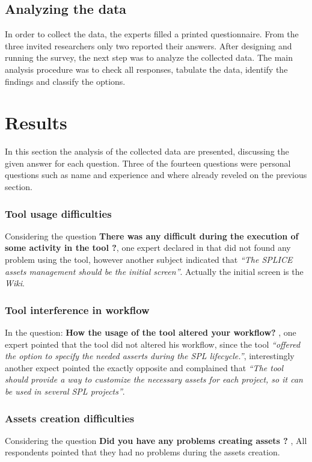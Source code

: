 \subsection{Analyzing the data}

In  order  to  collect  the  data, the  experts  filled a printed questionnaire.  From the  three  invited  researchers  only  two  reported  their  answers. 
After designing and running the survey, the next step was to analyze the collected data. The main analysis procedure was to check all responses, tabulate the data, identify the findings and classify the options. 

\section{Results}
\label{sc:datacollection}

In  this  section  the  analysis  of  the  collected  data  are  presented, discussing  the  given  answer  for  each  question. Three of the fourteen questions were personal questions such as name and experience and where already reveled on the previous section.

\subsubsection{Tool usage difficulties}
Considering the question \textbf{There was any difficult during the execution of some activity in the tool ?},  one expert declared in that did not found any problem using the tool, however another subject indicated that \textit{“The SPLICE assets management should be the initial screen”}. Actually the initial screen is the \textit{Wiki}.

\subsubsection {Tool interference in workflow}
In the question:  \textbf{How the usage of the tool altered your workflow? }, one expert pointed that the tool did not altered his workflow, since the tool \textit{“offered the option to specify the needed asserts during the SPL lifecycle.”}, interestingly another expect pointed the exactly opposite and complained that \textit{“The tool should provide a way to customize the necessary assets for each project, so it can be used in several SPL projects”}.


\subsubsection{Assets creation difficulties}
Considering the question \textbf{Did you have any problems creating assets ?} , 
All respondents pointed that they had no problems during the assets creation.

